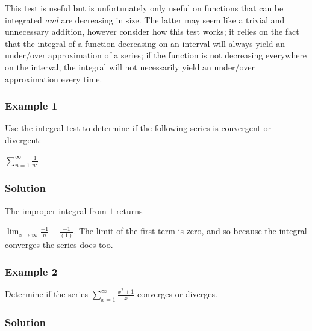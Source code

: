 This test is useful but is unfortunately only useful on functions that can be integrated \textit{and} are decreasing in size. The latter may seem like a trivial and unnecessary addition, however consider how this test works; it relies on the fact that the integral of a function decreasing on an interval will always yield an under/over approximation of a series; if the function is not decreasing everywhere on the interval, the integral will not necessarily yield an under/over approximation every time.


\subsubsection{Example 1}
\label{sss:exam-acc3}


Use the integral test to determine if the following series is convergent or divergent:


$\sum _{n=1}^{\infty}{\frac{1}{n^2}}$


\subsubsection{Solution}
\label{sss:solu-5502}


The improper integral from $1$ returns

$\lim _{x \rightarrow \infty} \frac{-1}{n} - \frac{-1}{(1)}$. The limit of the first term is zero, and so because the integral converges the series does too.


\subsubsection{Example 2}
\label{sss:exam-5bdd}


Determine if the series $\sum _{x=1}^{\infty}{\frac{x^2+1}{x}}$ converges or diverges.


\subsubsection{Solution}
\label{sss:solu-5502}


